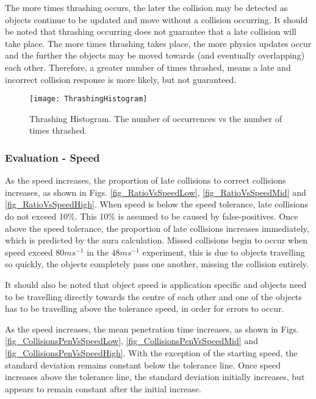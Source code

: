The more times thrashing occurs, the later the collision may be detected as objects continue to be updated and move without a collision occurring. It should be noted that thrashing occurring does not guarantee that a late collision will take place. The more times thrashing takes place, the more physics updates occur and the further the objects may be moved towards (and eventually overlapping) each other. Therefore, a greater number of times thrashed, means a late and incorrect collision response is more likely, but not guaranteed.

\begin{figure}[t]
	\centering
	\texttt{[image: ThrashingHistogram]}
	\caption{Thrashing Histogram. The number of occurrences vs the number of times thrashed.}
	\label{fig_ThrashingHistogram}
\end{figure}

\subsubsection{Evaluation - Speed}
As the speed increases, the proportion of late collisions to correct collisions increases, as shown in Figs. \ref{fig_RatioVsSpeedLow}, \ref{fig_RatioVsSpeedMid} and \ref{fig_RatioVsSpeedHigh}. When speed is below the speed tolerance, late collisions do not exceed 10\%. This 10\% is assumed to be caused by false-positives. Once above the speed tolerance, the proportion of late collisions increases immediately, which is predicted by the aura calculation. Missed collisions begin to occur when speed exceed $80ms^{-1}$ in the $48ms^{-1}$ experiment, this is due to objects travelling so quickly, the objects completely pass one another, missing the collision entirely.

It should also be noted that object speed is application specific and objects need to be travelling directly towards the centre of each other and one of the objects has to be travelling above the tolerance speed, in order for errors to occur.

As the speed increases, the mean penetration time increases, as shown in Figs. \ref{fig_CollisionsPenVsSpeedLow}, \ref{fig_CollisionsPenVsSpeedMid} and \ref{fig_CollisionsPenVsSpeedHigh}. With the exception of the starting speed, the standard deviation remains constant below the tolerance line. Once speed increases above the tolerance line, the standard deviation initially increases, but appears to remain constant after the initial increase. 

